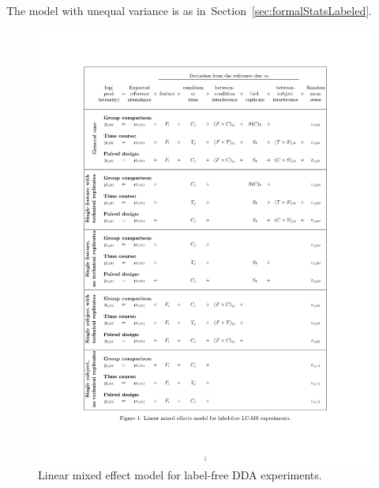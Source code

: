 \documentclass[11pt]{article}
\def\secref#1{Section~\ref{sec:#1}}
\begin{document}
The model with unequal variance is as in~\secref{formalStatsLabeled}.

\begin{figure}[h!]
\begin{center}
\includegraphics[width=5in]{StatModel_labelfree.pdf}
\vspace{-0.3cm}
\caption{\small Linear mixed effect model for label-free DDA experiments. \label{fig:statModelFree}}
\end{center}
\end{figure}
\end{document}
